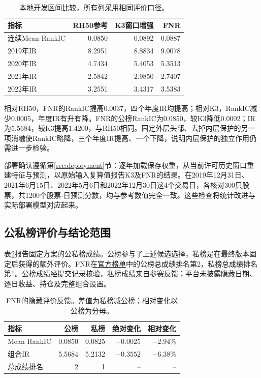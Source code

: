 \documentclass[UTF8,11pt,a4paper,fontset=fandol]{ctexart}
\begin{document}
\begin{table}[htbp]\centering\small
\caption{本地开发区间比较，所有列采用相同评价口径。}\label{tab:local}
\begin{tabular}{lrrr}\toprule
指标 & RH50参考 & K3窗口增强 & FNR\\\midrule
连续Mean RankIC & 0.0850 & 0.0892 & 0.0887\\
2019年IR & 8.2951 & 8.8834 & 9.0078\\
2020年IR & 4.7434 & 5.4053 & 5.3513\\
2021年IR & 2.5842 & 2.9850 & 2.7407\\
2022年IR & 3.2551 & 3.4317 & 3.5383\\\bottomrule
\end{tabular}
\end{table}

相对RH50，FNR的RankIC提高0.0037，四个年度IR均提高；相对K3，RankIC减少0.0005，年度IR有升有降。FNR的公榜RankIC为0.0850，较K3降低0.0002；IR为5.5684，较K3提高1.4200，与RH50相同。固定外层头部、去掉内层保护的另一项消融使RankIC略降，三个年度IR提高、一个下降，说明内层保护的独立作用仍需进一步检验。

部署确认遵循第\ref{sec:deployment}节：逐年加载保存权重，从当前许可历史窗口重建特征与预测，以原始输入复算值报告K3及FNR的结果。在2019年12月31日、2021年6月15日、2022年5月6日和2022年12月30日这4个交易日，各核对300只股票，共1200个股票-日预测分数，均与参考数值完全一致。这些检查将统计改进与实际部署模型对应起来。

\subsection{公私榜评价与结论范围}
表\ref{tab:hidden}报告固定方案的公私榜成绩。公榜参与了上述候选选择，私榜是在最终版本固定后获得的额外评价。FNR在\href{https://datatech.geekpie.club/c/csi300-2026/leaderboard}{官方榜单}中的公榜总成绩排名第2，私榜总成绩排名第1。公榜成绩经提交记录核验，私榜成绩来自参赛反馈；平台未披露隐藏日期、逐日收益、持仓及完整组合设置。

\begin{table}[htbp]\centering\small
\caption{FNR的隐藏评价反馈。差值为私榜减公榜；相对变化以公榜为分母。}\label{tab:hidden}
\begin{tabular}{lrrrr}\toprule
指标 & 公榜 & 私榜 & 绝对变化 & 相对变化\\\midrule
Mean RankIC & 0.0850 & 0.0825 & $-0.0025$ & $-2.94\%$\\
组合IR & 5.5684 & 5.2132 & $-0.3552$ & $-6.38\%$\\
总成绩排名 & 2 & 1 & -- & --\\\bottomrule
\end{tabular}
\end{table}
\end{document}
